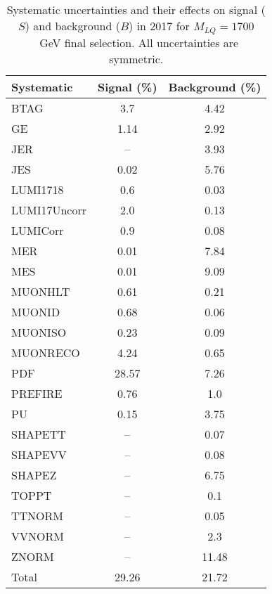 \begin{table}[htbp]
\begin{center}
\caption{Systematic uncertainties and their effects on signal ($S$) and background ($B$) in 2017 for $M_{LQ}=1700$~GeV final selection. All uncertainties are symmetric.}
\begin{tabular}{lcc}
\hline\hline
Systematic & Signal (\%) & Background (\%) \\ \hline 
BTAG & 3.7 & 4.42\\ 
GE & 1.14 & 2.92\\ 
JER & -- & 3.93\\ 
JES & 0.02 & 5.76\\ 
LUMI1718 & 0.6 & 0.03\\ 
LUMI17Uncorr & 2.0 & 0.13\\ 
LUMICorr & 0.9 & 0.08\\ 
MER & 0.01 & 7.84\\ 
MES & 0.01 & 9.09\\ 
MUONHLT & 0.61 & 0.21\\ 
MUONID & 0.68 & 0.06\\ 
MUONISO & 0.23 & 0.09\\ 
MUONRECO & 4.24 & 0.65\\ 
PDF & 28.57 & 7.26\\ 
PREFIRE & 0.76 & 1.0\\ 
PU & 0.15 & 3.75\\ 
SHAPETT & -- & 0.07\\ 
SHAPEVV & -- & 0.08\\ 
SHAPEZ & -- & 6.75\\ 
TOPPT & -- & 0.1\\ 
TTNORM & -- & 0.05\\ 
VVNORM & -- & 2.3\\ 
ZNORM & -- & 11.48\\ 
Total & 29.26 & 21.72\\ \hline \hline
\end{tabular}
\label{tab:SysUncertainties_uujj_1700}
\end{center}
\end{table}

